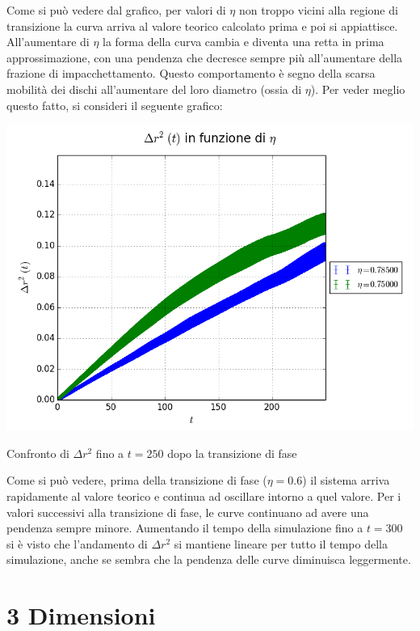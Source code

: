 Come si può vedere dal grafico, per valori di $\eta$ non troppo vicini alla regione di transizione la curva arriva al valore teorico calcolato prima e poi si appiattisce. All'aumentare di $\eta$ la forma della curva cambia e diventa una retta in prima approssimazione, con una pendenza che decresce sempre più all'aumentare della frazione di impacchettamento. Questo comportamento è segno della scarsa mobilità dei dischi all'aumentare del loro diametro (ossia di $\eta$).
Per veder meglio questo fatto, si consideri il seguente grafico:
\begin{myfig}[h!]
	\includegraphics[scale=0.5]{sfere2D/dr2cfr.png}
\caption{Confronto di $\Delta r^2$ fino a $t=250$ dopo la transizione di fase}
\end{myfig}
Come si può vedere, prima della transizione di fase ($\eta=0.6$) il sistema arriva rapidamente al valore teorico e continua ad oscillare intorno a quel valore.
Per i valori successivi alla transizione di fase, le curve continuano ad avere una pendenza sempre minore.
Aumentando il tempo della simulazione fino a $t=300$ si è visto che l'andamento di $\Delta r^2$ si mantiene lineare per tutto il tempo della simulazione, anche se sembra che la pendenza delle curve diminuisca leggermente.

\newpage
\clearpage
\section{3 Dimensioni}

